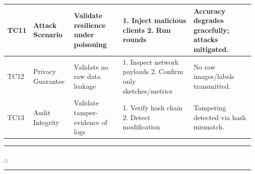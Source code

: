 \begin{longtable}{|p{1.1cm}|p{2cm}|p{2.5cm}|p{3cm}|p{3cm}|}
\hline
TC11 & Attack Scenario & Validate resilience under poisoning & 1. Inject malicious clients 2. Run rounds & Accuracy degrades gracefully; attacks mitigated. \\
\hline
TC12 & Privacy Guarantee & Validate no raw data leakage & 1. Inspect network payloads 2. Confirm only sketches/metrics & No raw images/labels transmitted. \\
\hline
TC13 & Audit Integrity & Validate tamper-evidence of logs & 1. Verify hash chain 2. Detect modification & Tampering detected via hash mismatch. \\
\hline
\end{longtable}

\rule{0.49\textwidth}{0.75pt} $_{\bigcirc}$ \rule{0.49\textwidth}{0.75pt}\\



